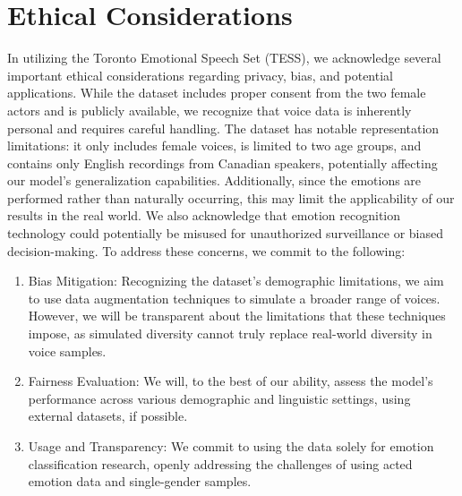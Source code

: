\documentclass[../main.tex]{subfiles}
\begin{document}
\section{Ethical Considerations}
In utilizing the Toronto Emotional Speech Set (TESS), we acknowledge several 
important ethical considerations regarding privacy, bias, and potential 
applications. While the dataset includes proper consent from the two female 
actors and is publicly available, we recognize that voice data is inherently 
personal and requires careful handling. The dataset has notable representation 
limitations: it only includes female voices, is limited to two age groups, and 
contains only English recordings from Canadian speakers, potentially affecting 
our model's generalization capabilities. Additionally, since the emotions are 
performed rather than naturally occurring, this may limit the applicability of 
our results in the real world. We also acknowledge that emotion recognition 
technology could potentially be misused for unauthorized surveillance or biased 
decision-making. To address these concerns, we commit to the following: 

\begin{enumerate}
    \item Bias Mitigation: Recognizing the dataset's demographic limitations, we aim to 
    use data augmentation techniques to simulate a broader range of voices. However, 
    we will be transparent about the limitations that these techniques impose, as 
    simulated diversity cannot truly replace real-world diversity in voice samples.

    \item Fairness Evaluation: We will, to the best of our ability, assess the model's 
    performance across various demographic and linguistic settings, using external 
    datasets, if possible.

    \item Usage and Transparency: We commit to using the data solely for emotion 
    classification research, openly addressing the challenges of using acted 
    emotion data and single-gender samples.    
\end{enumerate}
\end{document}
